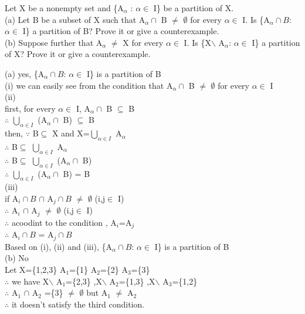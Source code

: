 \documentclass[11pt, a4paper, UTF8]{ctexart}
\begin{document}
\begin{problem}[UD:11.9]
Let X be a nonempty set and \{A$_\alpha$ : $\alpha \in$ I\} be a partition of X.\\
(a) Let B be a subset of X such that A$_\alpha \cap$ B $\not=$ $\emptyset$ for every $\alpha \in$ I. Is \{A$_\alpha \cap B$: $\alpha \in$ I\} a partition of B? Prove it or give a counterexample.\\
(b) Suppose further that A$_\alpha$ $\not=$ X for every $\alpha \in$ I. Is \{X$\backslash$ A$_\alpha$: $\alpha \in$ I\} a partition of X? Prove it or give a counterexample.
\end{problem}
\begin{solution}
(a) yes, \{A$_\alpha \cap B$: $\alpha \in$ I\} is a partition of B\\
(i) we can easily see from the condition that A$_\alpha \cap$ B $\not=$ $\emptyset$ for every $\alpha \in$ I\\
(ii)\\
\indent first, for every $\alpha \in$ I, A$_\alpha \cap$ B $\subseteq$ B \\
$\therefore$ $\bigcup_{\alpha \in I}$ (A$_\alpha \cap$ B) $\subseteq$ B\\
\indent then, $\because$ B$\subseteq$ X and  X=$\bigcup_{\alpha \in I}$ A$_\alpha$ \\
$\therefore$ B$\subseteq$ $\bigcup_{\alpha \in I}$ A$_\alpha$\\
$\therefore$ B$\subseteq$ $\bigcup_{\alpha \in I}$ (A$_\alpha \cap$ B)\\
$\therefore$ $\bigcup_{\alpha \in I}$ (A$_\alpha \cap$ B) = B\\
(iii)\\
if A$_i \cap B$ $\cap$ A$_j \cap B$ $\not=$ $\emptyset$ (i,j$\in$ I)\\
$\therefore$  A$_i$ $\cap$ A$_j$ $\not=$ $\emptyset$ (i,j$\in$ I)\\
$\therefore$ acoodint to the condition , A$_i$=A$_j$\\
$\therefore$ A$_i \cap B$ = A$_j \cap B$\\
Based on (i), (ii) and (iii), \{A$_\alpha \cap B$: $\alpha \in$ I\} is a partition of B\\
(b) No\\
Let X=\{1,2,3\} A$_1$=\{1\}  A$_2$=\{2\}  A$_3$=\{3\} \\
$\therefore$ we have X$\backslash$ A$_1$=\{2,3\} ,X$\backslash$ A$_2$=\{1,3\} ,X$\backslash$ A$_3$=\{1,2\} \\
$\therefore$ A$_1$ $\cap$ A$_2$ =\{3\} $\not=$ $\emptyset$ but A$_1$ $\not=$ A$_2$\\
$\therefore$ it doesn't satisfy the third condition.\\
\end{solution}
\end{document}
